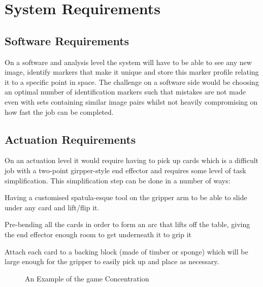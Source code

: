\documentclass[dvips,12pt]{article}
\begin{document}
\section{System Requirements}
	\subsection{Software Requirements}
		On a software and analysis level the system will have to be able to see any new image, identify markers that make it unique and store this marker profile relating it to a specific point in space. The challenge on a software side would be choosing an optimal number of  identification markers such that mistakes are not made even with sets containing similar image pairs whilst not heavily compromising on how fast the job can be completed.
	\subsection{Actuation Requirements}
		On an actuation level it would require having to pick up cards which is a difficult job with a two-point girpper-style end effector and requires some level of task simplification. This simplification step can be done in a number of ways:
		\begin{list}{:~}{}
			\item Having a customised spatula-esque tool on the gripper arm to be able to slide under any card and lift/flip it.
			\item Pre-bending all the cards in order to form an arc that lifts off the table, giving the end effector enough room to get underneath it to grip it
			\item Attach each card to a backing block (made of timber or sponge) which will be large enough for the gripper to easily pick up and place as necessary.
		\end{list}
		
		\begin{figure}[position = here]
			\begin{center}
			\end{center}
			
			\caption{An Example of the game Concentration\label{pic1}}
			
		\end{figure}
\end{document}
